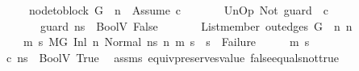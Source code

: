 \begin{isabellebody}
\ \ \ \ \ \ \ {\isachardoublequoteopen}node{\isacharunderscore}{\kern0pt}to{\isacharunderscore}{\kern0pt}block\ G\ {\isacharbang}{\kern0pt}\ n{}\ {\isacharequal}{\kern0pt}\ {\isacharbrackleft}{\kern0pt}Assume\ c{\isacharbrackright}{\kern0pt}{\isachardoublequoteclose}\isanewline
\ \ \ \ \ \ \ {\isachardoublequoteopen}UnOp\ Not\ guard\ {\isasymsim}\ c{\isachardoublequoteclose}\isanewline
\ \ \ \ \ \ \ {\isachardoublequoteopen}{\isasymLambda}{\isacharcomma}{\kern0pt}{\isasymGamma}{\isacharcomma}{\kern0pt}{\isasymOmega}\ {\isasymturnstile}\ {\isasymlangle}guard{\isacharcomma}{\kern0pt}\ ns{}{\isasymrangle}\ {\isasymDown}\ BoolV\ False{\isachardoublequoteclose}\isanewline
\ \ \ \ \ \ \ {\isachardoublequoteopen}List{\isachardot}{\kern0pt}member\ {\isacharparenleft}{\kern0pt}out{\isacharunderscore}{\kern0pt}edges\ G\ {\isacharbang}{\kern0pt}\ n{}{\isacharparenright}{\kern0pt}\ n{}{\isachardoublequoteclose}\isanewline
\ \ \ \ \ {\isachardoublequoteopen}{\isasymAnd}\ m\ s{\isachardot}{\kern0pt}\ {\isacharparenleft}{\kern0pt}M{\isacharcomma}{\kern0pt}{\isasymLambda}{\isacharcomma}{\kern0pt}{\isasymGamma}{\isacharcomma}{\kern0pt}{\isasymOmega}{\isacharcomma}{\kern0pt}G\ {\isasymturnstile}{\isacharparenleft}{\kern0pt}Inl\ n{}{\isacharcomma}{\kern0pt}\ Normal\ ns{}{\isacharparenright}{\kern0pt}\ {\isacharminus}{\kern0pt}n{\isasymrightarrow}{\isacharasterisk}{\kern0pt}\ {\isacharparenleft}{\kern0pt}m{\isacharcomma}{\kern0pt}\ s{\isacharparenright}{\kern0pt}{\isacharparenright}{\kern0pt}\ {\isasymLongrightarrow}\ s\ {\isasymnoteq}\ Failure{\isachardoublequoteclose}\isanewline
%
\isadelimproof
%
\endisadelimproof
%
\isatagproof
{}\isamarkupfalse%
\ {\isacharminus}{\kern0pt}\isanewline
\ \ \isamarkupfalse%
\ m{}\ s{}\isanewline
\ \ \isamarkupfalse%
\ {\isachardoublequoteopen}{\isasymLambda}{\isacharcomma}{\kern0pt}{\isasymGamma}{\isacharcomma}{\kern0pt}{\isasymOmega}\ {\isasymturnstile}\ {\isasymlangle}c{\isacharcomma}{\kern0pt}\ ns{}{\isasymrangle}\ {\isasymDown}\ BoolV\ True{\isachardoublequoteclose}\ \isamarkupfalse%
\ assms{\isacharparenleft}{\kern0pt}{}{\isacharminus}{\kern0pt}{}{\isacharparenright}{\kern0pt}\ equiv{\isacharunderscore}{\kern0pt}preserves{\isacharunderscore}{\kern0pt}value\ false{\isacharunderscore}{\kern0pt}equals{\isacharunderscore}{\kern0pt}not{\isacharunderscore}{\kern0pt}true\ \isamarkupfalse%

\end{isabellebody}
